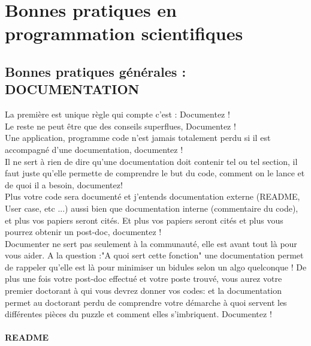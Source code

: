\documentclass[a4paper,10pt]{book_ad}
\begin{document}
\section{Bonnes pratiques en programmation scientifiques}

\subsection{Bonnes pratiques générales : DOCUMENTATION}

La première est unique règle qui compte c'est : Documentez ! \\

Le reste ne peut être que des conseils superflues, Documentez ! \\

Une application, programme code n'est jamais totalement perdu si il est accompagné d'une documentation,
 documentez !\\

Il ne sert à rien de dire qu'une documentation doit contenir tel ou tel section, il faut juste 
qu'elle permette de comprendre le but du code, comment on le lance et de quoi il a besoin, documentez! \\

Plus votre code sera documenté et j'entends documentation externe (README, User case, etc ...) aussi 
bien que documentation interne (commentaire du code), et plus vos papiers seront cités. 
Et plus vos papiers seront cités et plus vous pourrez obtenir un post-doc, documentez ! \\

Documenter ne sert pas seulement à la communauté, elle est avant tout là pour vous aider. 
A la question :"A quoi sert cette fonction" une documentation permet de rappeler qu'elle
 est là pour minimiser un bidules selon un algo quelconque ! De plus une fois votre post-doc
 effectué et votre poste trouvé, vous aurez votre premier doctorant à qui vous devrez donner vos codes:
 et la documentation permet au doctorant perdu de comprendre votre démarche à quoi servent 
les différentes pièces du puzzle et comment elles s'imbriquent. Documentez !\\

\paragraph{README}
\end{document}
